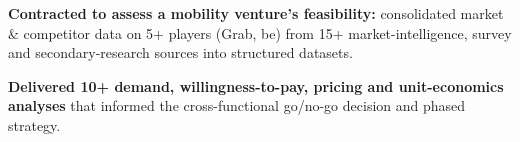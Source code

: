 
\vspace{1pt}
\begin{resume_list}
  \item \textbf{Contracted to assess a mobility venture's feasibility:} consolidated market \& competitor data on 5+ players (Grab, be) from 15+ market-intelligence, survey and secondary-research sources into structured datasets.
  \item \textbf{Delivered 10+ demand, willingness-to-pay, pricing and unit-economics analyses} that informed the cross-functional go/no-go decision and phased strategy.
\end{resume_list}
